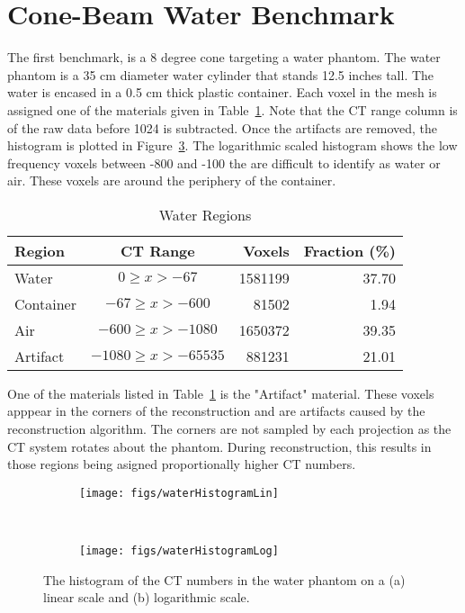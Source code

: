 \section{Cone-Beam Water Benchmark}\label{sec:cone1}

The first benchmark, is a 8 degree cone targeting a water phantom. The water phantom is a 35 cm diameter water cylinder that stands 12.5 inches tall. The water is encased in a 0.5 cm thick plastic container. Each voxel in the mesh is assigned one of the materials given in Table~\ref{tab:watermats}. Note that the CT range column is of the raw data before 1024 is subtracted. Once the artifacts are removed, the histogram is plotted in Figure~\ref{fig:waterHist}. The logarithmic scaled histogram shows the low frequency voxels between -800 and -100 the are difficult to identify as water or air. These voxels are around the periphery of the container.

\begin{table}[ht]
\caption{Water Regions}
\centering 
\begin{tabular}{l c r r}
\hline \hline   
Region    & CT Range & Voxels & Fraction (\%)\\ [0.5ex] 
\hline
Water     & $0 \geq x > -67$ & 1581199 & 37.70 \\
Container & $-67 \geq x > -600$ & 81502 & 1.94 \\
Air       & $-600 \geq x > -1080$ & 1650372  & 39.35 \\
Artifact  & $-1080 \geq x > -65535$ & 881231 & 21.01 \\  [1ex]
\hline
\end{tabular}
\label{tab:watermats}
\end{table}

One of the materials listed in Table~\ref{tab:watermats} is the "Artifact" material. These voxels apppear in the corners of the reconstruction and are artifacts caused by the reconstruction algorithm. The corners are not sampled by each projection as the CT system rotates about the phantom. During reconstruction, this results in those regions being asigned proportionally higher CT numbers.

\begin{figure}
    \centering
    \begin{subfigure}[b]{0.45\textwidth}
        \texttt{[image: figs/waterHistogramLin]}
        \caption{}
        \label{fig:waterHistLin}
    \end{subfigure}
    ~
    \begin{subfigure}[b]{0.45\textwidth}
        \texttt{[image: figs/waterHistogramLog]}
        \caption{}
        \label{fig:waterHistLog}
    \end{subfigure}
    \caption{The histogram of the CT numbers in the water phantom on a (a) linear scale and (b) logarithmic scale.}\label{fig:waterHist}
\end{figure}

